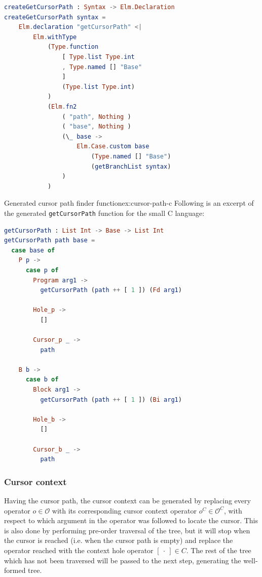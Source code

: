 \begin{lstlisting}[language=elm,style=inline,caption={getCursorPath function generator},label={lst:cursor-path-fun-gen}]
createGetCursorPath : Syntax -> Elm.Declaration
createGetCursorPath syntax =
    Elm.declaration "getCursorPath" <|
        Elm.withType
            (Type.function
                [ Type.list Type.int
                , Type.named [] "Base"
                ]
                (Type.list Type.int)
            )
            (Elm.fn2
                ( "path", Nothing )
                ( "base", Nothing )
                (\_ base ->
                    Elm.Case.custom base
                        (Type.named [] "Base")
                        (getBranchList syntax)
                )
            )    
\end{lstlisting}

\begin{example}{Generated cursor path finder function}{ex:cursor-path-c}
Following is an excerpt of the generated \texttt{getCursorPath} function 
for the small C language:
\begin{lstlisting}[language=elm,style=inline,backgroundcolor=\color{myexamplecolorback}]
getCursorPath : List Int -> Base -> List Int
getCursorPath path base =
  case base of
    P p ->
      case p of
        Program arg1 ->
          getCursorPath (path ++ [ 1 ]) (Fd arg1)

        Hole_p ->
          []

        Cursor_p _ ->
          path

    B b ->
      case b of
        Block arg1 ->
          getCursorPath (path ++ [ 1 ]) (Bi arg1)

        Hole_b ->
          []

        Cursor_b _ ->
          path
\end{lstlisting}
\end{example}


\subsubsection{Cursor context}

Having the cursor path, the cursor context can be generated by replacing every
operator $o \in \mathcal{O}$ with its corresponding cursor context operator
$o^C \in \mathcal{O}^C$, with respect to which argument in the operator was
followed to locate the cursor. This is also done by performing pre-order traversal
of the tree, but it will stop when the cursor is reached (i.e. when the
cursor path is empty) and replace the operator reached with the
context hole operator $[ \ \cdot \ ] \in C$. The rest of the tree which has not
been traversed will be passed to the next step, generating the well-formed tree.

